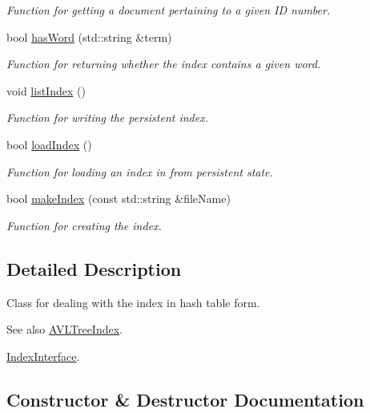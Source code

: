 \begin{DoxyCompactItemize}
\begin{DoxyCompactList}\small\item\em Function for getting a document pertaining to a given I\+D number. \end{DoxyCompactList}\item 
bool \hyperlink{class_hash_table_index_aea9366ff9299d41bd3447bc6c95a3960}{has\+Word} (std\+::string \&term)
\begin{DoxyCompactList}\small\item\em Function for returning whether the index contains a given word. \end{DoxyCompactList}\item 
void \hyperlink{class_hash_table_index_a42bbd9b325fb95b54a546c3c98c67624}{list\+Index} ()
\begin{DoxyCompactList}\small\item\em Function for writing the persistent index. \end{DoxyCompactList}\item 
bool \hyperlink{class_hash_table_index_a8c483a83b40b49b0f35be9fea0674501}{load\+Index} ()
\begin{DoxyCompactList}\small\item\em Function for loading an index in from persistent state. \end{DoxyCompactList}\item 
bool \hyperlink{class_hash_table_index_a5105f715d8c5fd3b74d6bec462cb0c38}{make\+Index} (const std\+::string \&file\+Name)
\begin{DoxyCompactList}\small\item\em Function for creating the index. \end{DoxyCompactList}\end{DoxyCompactItemize}


\subsection{Detailed Description}
Class for dealing with the index in hash table form. 

\begin{DoxySeeAlso}{See also}
\hyperlink{class_a_v_l_tree_index}{A\+V\+L\+Tree\+Index}. 

\hyperlink{class_index_interface}{Index\+Interface}. 
\end{DoxySeeAlso}


\subsection{Constructor \& Destructor Documentation}
\hypertarget{class_hash_table_index_a13c1c8deae84226c8bef382adf103b53}{}
